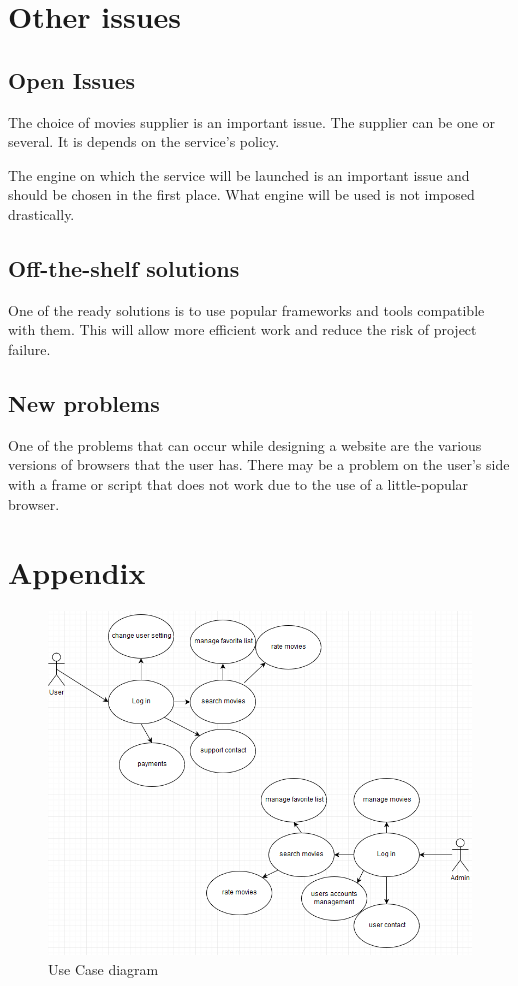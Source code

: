\documentclass{scrreprt}
\begin{document}
\chapter{Other issues}

\section{Open Issues}
The choice of movies supplier is an important issue. The supplier can be one or several. It is depends on the service's policy.

The engine on which the service will be launched is an important issue and should be chosen in the first place. What engine will be used is not imposed drastically.

\section{Off-the-shelf solutions}

One of the ready solutions is to use popular frameworks and tools compatible with them. This will allow more efficient work and reduce the risk of project failure.

\section{New problems}

One of the problems that can occur while designing a website are the various versions of browsers that the user has. There may be a problem on the user's side with a frame or script that does not work due to the use of a little-popular browser.

\chapter {Appendix}

\begin{figure}[hp]
  \centering
  \includegraphics[width=1\textwidth]{img/usecase.PNG}
  \caption{Use Case diagram}
  \label{fig:Use case}
\end{figure}

\nocite{*}
\end{document}
